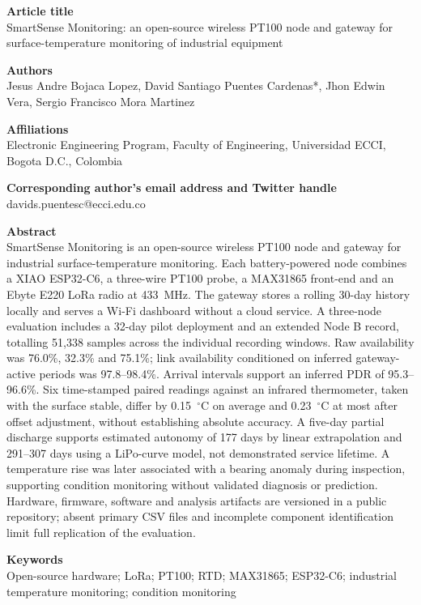 \documentclass[11pt, letterpaper]{article}
\begin{document}
\begin{flushleft}

\textbf{Article title}\\
SmartSense Monitoring: an open-source wireless PT100 node and gateway for surface-temperature monitoring of industrial equipment

\textbf{Authors}\\
Jesus Andre Bojaca Lopez, David Santiago Puentes Cardenas*, Jhon Edwin Vera, Sergio Francisco Mora Martinez

\textbf{Affiliations}\\
Electronic Engineering Program, Faculty of Engineering, Universidad ECCI, Bogota D.C., Colombia

\textbf{Corresponding author's email address and Twitter handle}\\
davids.puentesc@ecci.edu.co

\textbf{Abstract}\\
SmartSense Monitoring is an open-source wireless PT100 node and gateway for industrial surface-temperature monitoring. Each battery-powered node combines a XIAO ESP32-C6, a three-wire PT100 probe, a MAX31865 front-end and an Ebyte E220 LoRa radio at 433~MHz. The gateway stores a rolling 30-day history locally and serves a Wi-Fi dashboard without a cloud service. A three-node evaluation includes a 32-day pilot deployment and an extended Node B record, totalling 51{,}338 samples across the individual recording windows. Raw availability was 76.0\%, 32.3\% and 75.1\%; link availability conditioned on inferred gateway-active periods was 97.8--98.4\%. Arrival intervals support an inferred PDR of 95.3--96.6\%. Six time-stamped paired readings against an infrared thermometer, taken with the surface stable, differ by 0.15~$^{\circ}$C on average and 0.23~$^{\circ}$C at most after offset adjustment, without establishing absolute accuracy. A five-day partial discharge supports estimated autonomy of 177 days by linear extrapolation and 291--307 days using a LiPo-curve model, not demonstrated service lifetime. A temperature rise was later associated with a bearing anomaly during inspection, supporting condition monitoring without validated diagnosis or prediction. Hardware, firmware, software and analysis artifacts are versioned in a public repository; absent primary CSV files and incomplete component identification limit full replication of the evaluation.

\textbf{Keywords}\\
Open-source hardware; LoRa; PT100; RTD; MAX31865; ESP32-C6; industrial temperature monitoring; condition monitoring


\end{flushleft}
\end{document}
